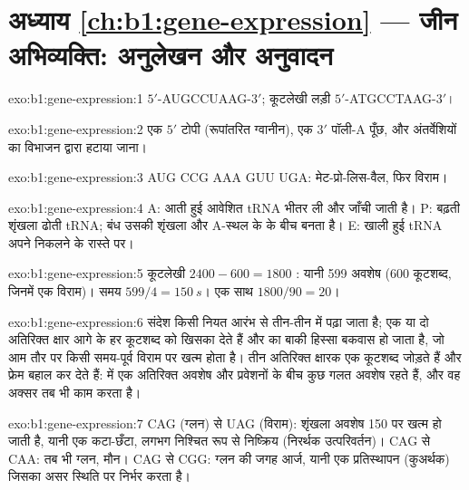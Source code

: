 \section*{अध्याय \ref{ch:b1:gene-expression} --- जीन अभिव्यक्ति: अनुलेखन और अनुवादन}

\begin{solution}{exo:b1:gene-expression:1}
 $5'$-AUGCCUAAG-$3'$; कूटलेखी लड़ी $5'$-ATGCCTAAG-$3'$।
\end{solution}

\begin{solution}{exo:b1:gene-expression:2}
एक $5'$ टोपी (रूपांतरित ग्वानीन), एक $3'$ पॉली-A पूँछ, और
अंतर्वेशियों का विभाजन द्वारा हटाया जाना।
\end{solution}

\begin{solution}{exo:b1:gene-expression:3}
AUG CCG AAA GUU UGA: मेट-प्रो-लिस-वैल, फिर विराम।
\end{solution}

\begin{solution}{exo:b1:gene-expression:4}
A: आती हुई आवेशित tRNA भीतर ली और जाँची जाती है। P: बढ़ती शृंखला ढोती
tRNA; बंध उसकी शृंखला और A-स्थल के  के बीच बनता है। E: खाली हुई
tRNA अपने निकलने के रास्ते पर।
\end{solution}

\begin{solution}{exo:b1:gene-expression:5}
कूटलेखी $2400 - 600 = 1800$ : यानी 599 अवशेष (600 कूटशब्द,
जिनमें एक विराम)। समय $599/4 = \qty{150}{s}$। एक साथ  $1800/90 = 20$।
\end{solution}

\begin{solution}{exo:b1:gene-expression:6}
संदेश किसी नियत आरंभ से तीन-तीन में पढ़ा जाता है; एक या दो अतिरिक्त
क्षार आगे के हर कूटशब्द को खिसका देते हैं और  का बाकी हिस्सा
बकवास हो जाता है, जो आम तौर पर किसी समय-पूर्व विराम पर खत्म होता है।
तीन अतिरिक्त क्षारक एक कूटशब्द जोड़ते हैं और फ्रेम बहाल कर देते हैं:
 में एक अतिरिक्त अवशेष और प्रवेशनों के बीच कुछ गलत अवशेष रहते हैं,
और वह अक्सर तब भी काम करता है।
\end{solution}

\begin{solution}{exo:b1:gene-expression:7}
CAG (ग्लन) से UAG (विराम): शृंखला अवशेष 150 पर खत्म हो जाती है, यानी एक
कटा-छँटा, लगभग निश्चित रूप से निष्क्रिय  (निरर्थक उत्परिवर्तन)।
CAG से CAA: तब भी ग्लन, मौन। CAG से CGG: ग्लन की जगह आर्ज, यानी एक
प्रतिस्थापन (कुअर्थक) जिसका असर स्थिति पर निर्भर करता है।
\end{solution}


